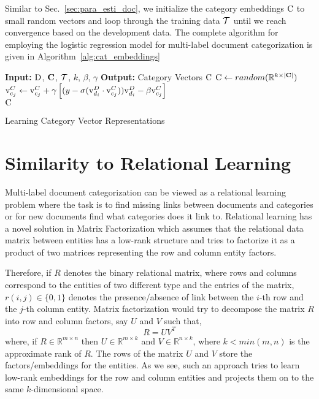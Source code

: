 Similar to Sec.~\ref{sec:para_esti_doc}, we initialize the category embeddings $\mathrm{C}$ to small random vectors and loop through the training data $\mathcal{T}$ until we reach convergence based on the development data. The complete algorithm for employing the logistic regression model for multi-label document categorization is given in Algorithm~\ref{alg:cat_embeddings}

\begin{algorithm}[h]
\begin{algorithmic}[1]
 \State \textbf{Input: } $\mathrm{D}$, $\mathbf{C}$, $\mathcal{T}$, $k$, $\beta$, $\gamma$
 \State \textbf{Output: } Category Vectors $\mathrm{C}$
 \State $\mathrm{C} \gets random(\mathbb{R}^{k \times |\mathbf{C}|})$
  \State $\mathrm{v}^{C}_{c_{j}} \gets \mathrm{v}^{C}_{c_{j}} + \gamma \left[ ( y - \sigma(\mathrm{v}^{D}_{d_{i}}\cdot \mathrm{v}^{C}_{c_{j}})) \mathrm{v}^{D}_{d_{i}} -\beta\mathrm{v}^{C}_{c_{j}} \right]$
 \EndFor 
 \EndWhile
 \\
 \Return $\mathrm{C}$
\end{algorithmic}
\caption{Learning Category Vector Representations}
\label{alg:cat_embeddings}
\end{algorithm}

\section{Similarity to Relational Learning}
\label{sec:lr_similar_rl}
Multi-label document categorization can be viewed as a relational learning problem where the task is to find missing links between documents and categories or for new documents find what categories does it link to. Relational learning has a novel solution in Matrix Factorization which assumes that the relational data matrix between entities has a low-rank structure and tries to factorize it as a product of two matrices representing the row and column entity factors. 

Therefore, if $R$ denotes the binary relational matrix, where rows and columns correspond to the entities of two different type and the entries of the matrix, $r(i, j) \in \{0,1\}$ denotes the presence/absence of link between the $i$-th row and the $j$-th column entity. Matrix factorization would try to decompose the matrix $R$ into row and column factors, say $U$ and $V$ such that,
\begin{equation}
\label{eq:mf_decompose}
R = UV^{T}
\end{equation}
where, if $R \in \mathbb{R}^{m \times n}$ then $U \in \mathbb{R}^{m \times k}$ and $V \in \mathbb{R}^{n \times k}$, where $k < min(m, n)$ is the approximate rank of $R$. The rows of the matrix $U$ and $V$ store the factors/embeddings for the entities. As we see, such an approach tries to learn low-rank embeddings for the row and column entities and projects them on to the same $k$-dimensional space.

